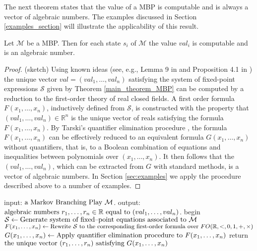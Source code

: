 \noindent


The next theorem states that the value of a MBP is computable and is always a vector of algebraic numbers. 
The examples discussed in Section \ref{examples_section} will illustrate the applicability of this result.

\begin{theorem}\label{computability_of_MBP}
Let $\mathcal{M}$ be a MBP. Then for each state $s_i$ of $\mathcal{M}$ the value $val_i$ is computable and is an algebraic number.\end{theorem}
\begin{proof} (sketch)
Using known ideas (see, e.g., Lemma 9 in \cite{AM04} and Proposition 4.1 in \cite{MioSimpsonFICS2013}) the unique vector $val\!=\!(val_1,\dots, val_n)$ satisfying the system of fixed-point expressions $\mathcal{S}$ given by Theorem \ref{main_theorem_MBP} can be computed by a reduction to the first-order theory of real closed fields. 
A first order formula $F(x_1,\dots,x_n)$, inductively defined from $\mathcal{S}$, is constructed with the property that $(val_1,\dots, val_n)\!\in\!\mathbb{R}^n$ is the unique vector of reals satisfying the formula $F(x_1,\dots,x_n)$. By Tarski's quantifier elimination procedure \cite{Tarski1951}, the formula $F(x_1,\dots,x_n)$ can be effectively reduced to an equivalent formula $G(x_1,\dots, x_n)$ without quantifiers, that is, to a Boolean combination of equations and inequalities between polynomials over $(x_1,\dots,x_n)$. It then follows that the  $(val_1,\dots, val_n)$, which can be extracted from $G$ with standard methods, is a vector of algebraic numbers.  In Section \ref{sec:examples} we apply the procedure described above to a number of examples.
\end{proof}

\begin{algorithm}[caption={computing the vector of values of a MBP.}, label={alg1}]
 input: $\textnormal{a Markov Branching Play } {\mathcal M}$. 
 output: $\textnormal{algebraic numbers }r_1,\ldots,r_n\in{\mathbb R} \textnormal{ equal to } (val_1,\ldots,val_n)$. 
 begin
   $\mathcal{S}\gets \textnormal{Generate system of fixed--point equations associated to }\mathcal{M}$
   $F(x_1,\ldots,x_n)\gets \textnormal{Rewrite }\mathcal{S} \textnormal{ to the corresponding first-order formula over\ } FO(\mathbb{R},<,0,1,+,\times) $
   $G(x_1,\ldots,x_n)\gets \textnormal{Apply quantifier elimination procedure to } F(x_1,\ldots,x_n)$
 return $\textnormal{the unique vector }(r_1,\dots, r_n) \textnormal{ satisfying } G(x_1,\dots, x_n)$ 
\end{algorithm}

